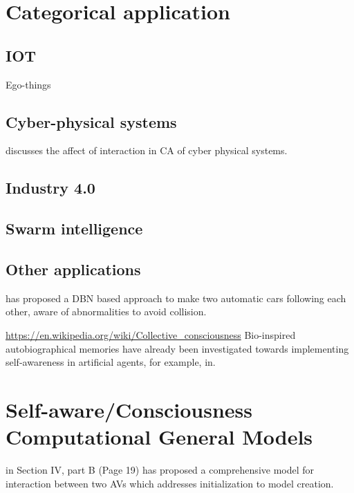 \documentclass{article}
\begin{document}
	\section{Categorical application}
		\subsection{IOT}
			Ego-things
		\subsection{Cyber-physical systems}
			\citet{esterle-2020-i-think-therefore-you-are-models-for-interaction-in-collectives-of-self-aware-cyber-physical-systems} discusses the affect of interaction in CA of cyber physical systems.
		\subsection{Industry 4.0}
		\subsection{Swarm intelligence}
		\subsection{Other applications}
	\cite{kanapram-2020-collective-awareness-for-abnormality-detection-in-connected-autonomous-vehicles} has proposed a DBN based approach to make two automatic cars following each other, aware of abnormalities to avoid collision. 
	
	\cite{kephart-2017-self-adaptation-in-collective-self-aware-computing-systems}
	
	\url{https://en.wikipedia.org/wiki/Collective_consciousness} 
	Bio-inspired autobiographical memories have already been investigated towards implementing self-awareness in artificial agents, for example, in\cite{landauer-2015-designing-cooperating-self-improving-systems}.
	
	\section{Self-aware/Consciousness Computational General Models}
	\citet{regazzoni-2020-multi-sensorial-generative-and-descriptive-self-awareness-models-for-autonomous-systems} in Section IV, part B (Page 19) has proposed a comprehensive model for interaction between two AVs which addresses initialization to model creation. 
	
\end{document}
